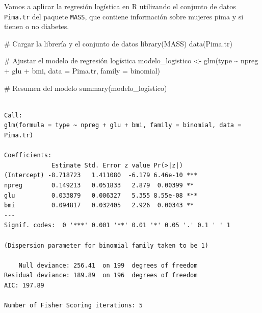 \documentclass[
  letterpaper,
  DIV=11,
  numbers=noendperiod]{scrreprt}
\newenvironment{Shaded}{\begin{snugshade}}{\end{snugshade}}
\newcommand{\AttributeTok}[1]{\textcolor[rgb]{0.40,0.45,0.13}{#1}}
\newcommand{\CommentTok}[1]{\textcolor[rgb]{0.37,0.37,0.37}{#1}}
\newcommand{\FunctionTok}[1]{\textcolor[rgb]{0.28,0.35,0.67}{#1}}
\newcommand{\NormalTok}[1]{\textcolor[rgb]{0.00,0.23,0.31}{#1}}
\newcommand{\OtherTok}[1]{\textcolor[rgb]{0.00,0.23,0.31}{#1}}
\newcommand{\SpecialCharTok}[1]{\textcolor[rgb]{0.37,0.37,0.37}{#1}}
\begin{document}
\begin{tcolorbox}[enhanced jigsaw, leftrule=.75mm, breakable, colbacktitle=quarto-callout-tip-color!10!white, bottomrule=.15mm, colframe=quarto-callout-tip-color-frame, toprule=.15mm, colback=white, coltitle=black, bottomtitle=1mm, left=2mm, title=\textcolor{quarto-callout-tip-color}{\faLightbulb}\hspace{0.5em}{Ejemplo}, opacityback=0, arc=.35mm, opacitybacktitle=0.6, toptitle=1mm, titlerule=0mm, rightrule=.15mm]

Vamos a aplicar la regresión logística en R utilizando el conjunto de
datos \texttt{Pima.tr} del paquete \texttt{MASS}, que contiene
información sobre mujeres pima y si tienen o no diabetes.

\begin{Shaded}
\begin{Highlighting}[]
\CommentTok{\# Cargar la librería y el conjunto de datos}
\FunctionTok{library}\NormalTok{(MASS)}
\FunctionTok{data}\NormalTok{(Pima.tr)}

\CommentTok{\# Ajustar el modelo de regresión logística}
\NormalTok{modelo\_logistico }\OtherTok{\textless{}{-}} \FunctionTok{glm}\NormalTok{(type }\SpecialCharTok{\textasciitilde{}}\NormalTok{ npreg }\SpecialCharTok{+}\NormalTok{ glu }\SpecialCharTok{+}\NormalTok{ bmi, }\AttributeTok{data =}\NormalTok{ Pima.tr, }\AttributeTok{family =}\NormalTok{ binomial)}

\CommentTok{\# Resumen del modelo}
\FunctionTok{summary}\NormalTok{(modelo\_logistico)}
\end{Highlighting}
\end{Shaded}

\begin{verbatim}

Call:
glm(formula = type ~ npreg + glu + bmi, family = binomial, data = Pima.tr)

Coefficients:
             Estimate Std. Error z value Pr(>|z|)    
(Intercept) -8.718723   1.411080  -6.179 6.46e-10 ***
npreg        0.149213   0.051833   2.879  0.00399 ** 
glu          0.033879   0.006327   5.355 8.55e-08 ***
bmi          0.094817   0.032405   2.926  0.00343 ** 
---
Signif. codes:  0 '***' 0.001 '**' 0.01 '*' 0.05 '.' 0.1 ' ' 1

(Dispersion parameter for binomial family taken to be 1)

    Null deviance: 256.41  on 199  degrees of freedom
Residual deviance: 189.89  on 196  degrees of freedom
AIC: 197.89

Number of Fisher Scoring iterations: 5
\end{verbatim}


\end{tcolorbox}
\end{document}
